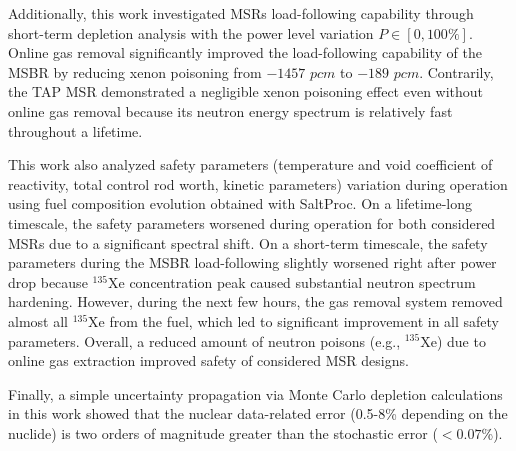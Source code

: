 Additionally, this work investigated \glspl{MSR} load-following capability 
through short-term depletion analysis with the power level variation 
$P\in[0,100\%]$. Online gas removal significantly improved the load-following 
capability of the \gls{MSBR} by reducing xenon poisoning from $-1457$ $pcm$ to 
$-189$ $pcm$. Contrarily, the \gls{TAP} \gls{MSR} demonstrated a negligible 
xenon poisoning effect even without online gas removal because its neutron 
energy spectrum is relatively fast throughout a lifetime.

This work also analyzed safety parameters (temperature and void coefficient of 
reactivity, total control rod worth, kinetic parameters) variation during 
operation using fuel composition evolution obtained with SaltProc. On a 
lifetime-long timescale, the safety parameters worsened during operation for 
both considered \glspl{MSR} due to a significant spectral shift. On a 
short-term timescale, the safety parameters during the \gls{MSBR} 
load-following slightly worsened right after power drop because $^{135}$Xe 
concentration peak caused substantial neutron spectrum hardening. However, 
during the next few hours, the gas removal system removed almost all 
$^{135}$Xe from the fuel, which led to significant improvement in all safety 
parameters. Overall, a reduced amount of neutron poisons (e.g., $^{135}$Xe) 
due to online gas extraction improved safety of considered \gls{MSR} designs.

Finally, a simple uncertainty propagation via Monte Carlo depletion 
calculations in this work showed that the nuclear data-related error (0.5-8\% 
depending on the nuclide) is two orders of magnitude greater than the 
stochastic error ($<0.07$\%).